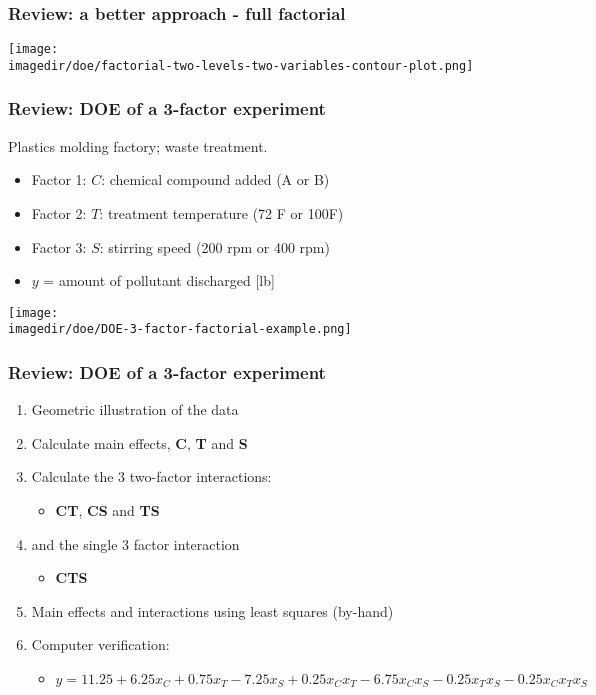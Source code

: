 \begin{frame}\frametitle{Review: a better approach - full factorial}
	\begin{center}
		\texttt{[image: \\imagedir/doe/factorial-two-levels-two-variables-contour-plot.png]}
	\end{center}
\end{frame}

\begin{frame}\frametitle{Review: DOE of a 3-factor experiment}

	Plastics molding factory; waste treatment.
	\begin{itemize}
		\item	Factor 1: $C$: chemical compound added (A or B)
		\item	Factor 2: $T$: treatment temperature (72 F or 100F)
		\item	Factor 3: $S$: stirring speed (200 rpm or 400 rpm)
		\item	$y$ = amount of pollutant discharged [lb]
	\end{itemize}
	\begin{center}
		\texttt{[image: \\imagedir/doe/DOE-3-factor-factorial-example.png]}
	\end{center}
\end{frame}

\begin{frame}\frametitle{Review: DOE of a 3-factor experiment}
	\begin{enumerate}
		\item	Geometric illustration of the data
		\item	Calculate main effects, \textbf{C}, \textbf{T} and \textbf{S}
		\item	Calculate the 3 two-factor interactions:
		\begin{itemize}
			\item	\textbf{CT}, \textbf{CS} and \textbf{TS}
		\end{itemize}
		\item	and the single 3 factor interaction
		\begin{itemize}
			\item	\textbf{CTS}
		\end{itemize}
		\item	Main effects and interactions using least squares (by-hand)
		\item	Computer verification:
		\begin{itemize}
			\item	$y = 11.25 + 6.25x_C + 0.75x_T -7.25x_S + 0.25 x_C x_T -6.75 x_C x_S -0.25 x_T x_S - 0.25 x_C x_T x_S$
		\end{itemize}
	\end{enumerate}
\end{frame}


